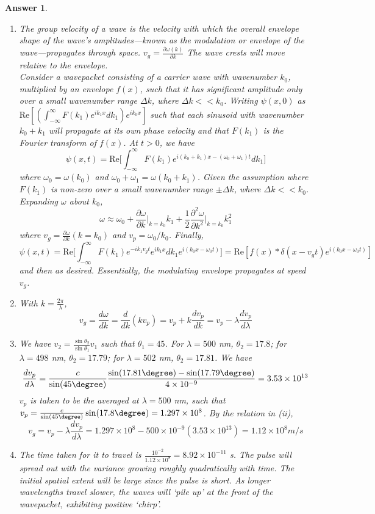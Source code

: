 \documentclass[a4paper]{article}
\newtheorem{ans}{Answer}[subsection]
\theoremstyle{new}
\begin{document}
\begin{ans}\leavevmode
\begin{enumerate}[label=(\roman*)]
\item The group velocity of a wave is the velocity with which the overall envelope shape of the wave's amplitudes—known as the modulation or envelope of the wave—propagates through space. $v_g=\frac{\partial\omega(k)}{\partial k}$ The wave crests will move relative to the envelope.\\[5pt]
Consider a wavepacket consisting of a carrier wave with wavenumber $k_0$, multiplied by an envelope $f(x)$, such that it has significant amplitude only over a small wavenumber range $\Delta k$, where $\Delta k<<k_0$. Writing $\psi(x,0)$ as $\text{Re}[(\int_{-\infty}^\infty F(k_1)e^{ik_1x}dk_1)e^{ik_0x}]$ such that each sinusoid with wavenumber $k_0+k_1$ will propagate at its own phase velocity and that $F(k_1)$ is the Fourier transform of $f(x)$. At $t>0$, we have
$$\psi(x,t)=\text{Re}\bigg[\int_{-\infty}^\infty F(k_1)e^{i(k_0+k_1)x-(\omega_0+\omega_1)t}dk_1\bigg]$$
where $\omega_0=\omega(k_0)$ and $\omega_0+\omega_1=\omega(k_0+k_1)$. Given the assumption where $F(k_1)$ is non-zero over a small wavenumber range $\pm\Delta k$, where $\Delta k<<k_0$. Expanding $\omega$ about $k_0$,
$$\omega\approx\omega_0+\frac{\partial\omega}{\partial k}\bigg|_{k=k_0}k_1+\frac{1}{2}\frac{\partial^2\omega}{\partial k^2}\bigg|_{k=k_0}k_1^2$$
where $v_g=\frac{\partial\omega}{\partial k}(k=k_0)$ and $v_p=\omega_0/k_0$. Finally,
$$\psi(x,t)=\text{Re}\bigg[\int_{-\infty}^\infty F(k_1)e^{-ik_1v_gt}e^{ik_1x}dk_1e^{i(k_0x-\omega_0t)}\bigg]=\text{Re}[f(x)*\delta(x-v_gt)e^{i(k_0x-\omega_0t)}]$$
and then as desired. Essentially, the modulating envelope propagates at speed $v_g$.
\item With $k=\frac{2\pi}{\lambda}$,
$$v_g=\frac{d\omega}{d k}=\frac{d}{dk}(kv_p)=v_p+k\frac{dv_p}{dk}=v_p-\lambda\frac{dv_p}{d\lambda}$$
\item We have $v_2=\frac{\sin\theta_2}{\sin\theta_1}v_1$ such that $\theta_1=45$\degree. For $\lambda=500$ nm, $\theta_2=17.8$\degree; for $\lambda=498$ nm, $\theta_2=17.79$\degree; for $\lambda=502$ nm, $\theta_2=17.81$\degree. We have
$$\frac{dv_p}{d\lambda}=\frac{c}{\sin(45\degree)}\frac{\sin(17.81\degree)-\sin(17.79\degree)}{4\times10^{-9}}=3.53\times10^{13}$$
$v_p$ is taken to be the averaged at $\lambda=500$ nm, such that $v_p=\frac{c}{\sin(45\degree)}\sin(17.8\degree)=1.297\times10^8$. By the relation in (ii),
$$v_g=v_p-\lambda\frac{dv_p}{d\lambda}=1.297\times10^8-500\times10^{-9}(3.53\times10^{13})=1.12\times10^8m/s$$
\item The time taken for it to travel is $\frac{10^{-2}}{1.12\times10^8}=8.92\times10^{-11}$ s. The pulse will spread out with the variance growing roughly quadratically with time. The initial spatial extent will be large since the pulse is short. As longer wavelengths travel slower, the waves will `pile up' at the front of the wavepacket, exhibiting positive `chirp'.
\end{enumerate}
\end{ans}
\end{document}
